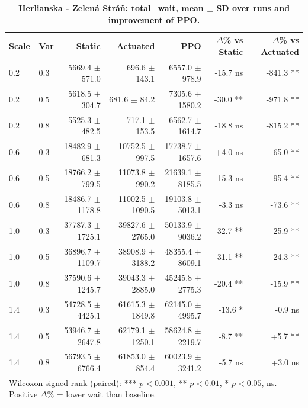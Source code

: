 \begin{table}
\caption{\textbf{Herlianska - Zelená Stráň: total\_wait, mean $\pm$ SD over runs and improvement of PPO.}}
\label{tab:stats_Herlianska_-_Zelená_Stráň_total_wait}
\centering
\begin{tabular}{llrrrrr}
\hline
Scale & Var & Static & Actuated & PPO & $\Delta$\% vs Static & $\Delta$\% vs Actuated \\
\hline
0.2 & 0.3 & 5669.4 $\pm$ 571.0 & 696.6 $\pm$ 143.1 & 6557.0 $\pm$ 978.9 & -15.7 ns & -841.3 ** \\
0.2 & 0.5 & 5618.5 $\pm$ 304.7 & 681.6 $\pm$ 84.2 & 7305.6 $\pm$ 1580.2 & -30.0 ** & -971.8 ** \\
0.2 & 0.8 & 5525.3 $\pm$ 482.5 & 717.1 $\pm$ 153.5 & 6562.7 $\pm$ 1614.7 & -18.8 ns & -815.2 ** \\
0.6 & 0.3 & 18482.9 $\pm$ 681.3 & 10752.5 $\pm$ 997.5 & 17738.7 $\pm$ 1657.6 & +4.0 ns & -65.0 ** \\
0.6 & 0.5 & 18766.2 $\pm$ 799.5 & 11073.8 $\pm$ 990.2 & 21639.1 $\pm$ 8185.5 & -15.3 ns & -95.4 ** \\
0.6 & 0.8 & 18486.7 $\pm$ 1178.8 & 11002.5 $\pm$ 1090.5 & 19103.8 $\pm$ 5013.1 & -3.3 ns & -73.6 ** \\
1.0 & 0.3 & 37787.3 $\pm$ 1725.1 & 39827.6 $\pm$ 2765.0 & 50133.9 $\pm$ 9036.2 & -32.7 ** & -25.9 ** \\
1.0 & 0.5 & 36896.7 $\pm$ 1109.7 & 38908.9 $\pm$ 3188.2 & 48355.4 $\pm$ 8609.1 & -31.1 ** & -24.3 ** \\
1.0 & 0.8 & 37590.6 $\pm$ 1245.7 & 39043.3 $\pm$ 2885.0 & 45245.8 $\pm$ 2775.3 & -20.4 ** & -15.9 ** \\
1.4 & 0.3 & 54728.5 $\pm$ 4425.1 & 61615.3 $\pm$ 1849.8 & 62145.0 $\pm$ 4995.7 & -13.6 * & -0.9 ns \\
1.4 & 0.5 & 53946.7 $\pm$ 2647.8 & 62179.1 $\pm$ 1250.1 & 58624.8 $\pm$ 2219.7 & -8.7 ** & +5.7 ** \\
1.4 & 0.8 & 56793.5 $\pm$ 6766.4 & 61853.0 $\pm$ 854.4 & 60023.9 $\pm$ 3241.2 & -5.7 ns & +3.0 ns \\
\hline
\multicolumn{7}{l}{\footnotesize Wilcoxon signed-rank (paired): *** $p<0.001$, ** $p<0.01$, * $p<0.05$, ns. Positive $\Delta$\% = lower wait than baseline.} \\
\end{tabular}
\end{table}
